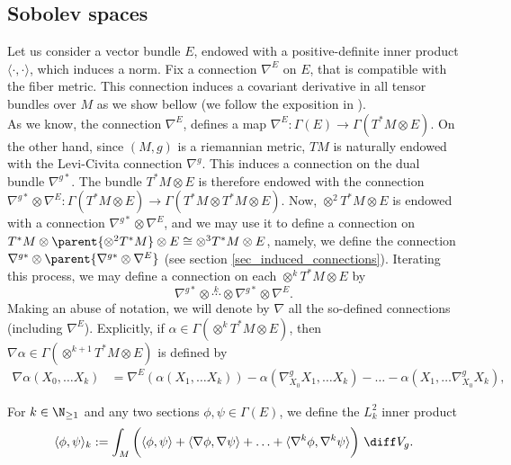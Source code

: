 \subsection{Sobolev spaces} \label{section_Sobolev_spaces} {\color{violet}
Let us consider a vector bundle \(E\), endowed with a positive-definite inner product \(\langle \cdot, \cdot \rangle\), which induces a norm. Fix a connection \(\nabla^E\) on \(E\), that is compatible with the fiber metric. This connection induces a covariant derivative in all tensor bundles over \(M\) as we show bellow (we follow the exposition in \parencite{wehrheim2004uhlenbeck}). \\

As we know, the connection \(\nabla^E\), defines a map \(\nabla^E\colon \Gamma(E) \to \Gamma(T^*M \otimes E)\). On the other hand, since \((M,g)\) is a riemannian metric, \(TM\) is naturally endowed with the Levi-Civita connection \(\nabla^g\). This induces a connection on the dual bundle \(\nabla^{g*}\). The bundle \(T^*M \otimes E\) is therefore endowed with the connection \(\nabla^{g*} \otimes \nabla^E \colon \Gamma(T^*M \otimes E) \to \Gamma(T^*M \otimes T^*M \otimes E)\). Now, \(\otimes^2 T^*M \otimes E\) is endowed with a connection \(\nabla^{g*} \otimes \nabla^E\), and we may use it to define a connection on \(T^*M \otimes \parent{\otimes^2 T^*M} \otimes E \cong\otimes^3 T^*M \otimes E\), namely, we define the connection \(\nabla^{g*} \otimes \parent{\nabla^{g*} \otimes \nabla^E}\) (see section \ref{sec_induced_connections}). Iterating this process, we may define a connection on each \(\otimes^k T^*M\otimes E\) by 
\[
\nabla^{g*} \otimes \overset{k}{\cdots} \otimes \nabla^{g*} \otimes \nabla^E.
\]
Making an abuse of notation, we will denote by \(\nabla\) all the so-defined connections (including \(\nabla^E\)). Explicitly, if \(\alpha \in \Gamma(\otimes^k T^*M \otimes E)\), then \(\nabla \alpha \in \Gamma(\otimes^{k+1}T^*M \otimes E)\) is defined by \parencite[Eq. B2]{wehrheim2004uhlenbeck}
\begin{align*}
    \nabla \alpha(X_0, \ldots X_k)& =  \nabla^E(\alpha(X_1, \ldots X_k)) - \alpha(\nabla_{X_0}^g X_1, \ldots X_k) - \ldots - \alpha(X_1, \ldots \nabla_{X_0}^g X_k), 
\end{align*}

For \(k \in \N_{\geq 1}\) and any two sections \(\phi, \psi \in \Gamma(E)\), we define the \(L_k^2\) inner product
\begin{equation} \label{prod_in_Gamma(E)}
\langle \phi, \psi\rangle_k:= \int_M \bigg( \langle \phi, \psi \rangle + \langle \nabla \phi, \nabla \psi \rangle  + \ldots+ \langle \nabla^k \phi, \nabla^k \psi \rangle \bigg) \ \diff V_g.
\end{equation}

}

